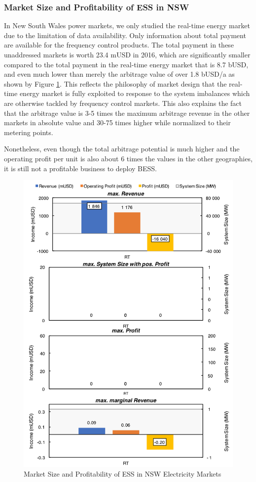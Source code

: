 \subsubsection{Market Size and Profitability of ESS in NSW}
In New South Wales power markets, we only studied the real-time energy market due to the limitation of data availability. Only information about total payment are available for the frequency control products. The total payment in these unaddressed markets is worth 23.4 mUSD in 2016, which are significantly smaller compared to the total payment in the real-time energy market that is 8.7 bUSD, and even much lower than merely the arbitrage value of over 1.8 bUSD/a as shown by Figure \ref{fig:nsw-ess}. This reflects the philosophy of market design that the real-time energy market is fully exploited to response to the system imbalances which are otherwise tackled by frequency control markets\cite{AEMO2010}\cite{McConnell2015}. This also explains the fact that the arbitrage value is 3-5 times the maximum arbitrage revenue in the other markets in absolute value and 30-75 times higher while normalized to their metering points.

Nonetheless, even though the total arbitrage potential is much higher and the operating profit per unit is also about 6 times the values in the other geographies, it is still not a profitable business to deploy BESS.

\begin{figure}[h!]
	\centering
	\includegraphics[width=0.9\linewidth]{Figures/NSW_ESS}
	\caption{Market Size and Profitability of ESS in NSW Electricity Markets}
	\label{fig:nsw-ess}
\end{figure}

